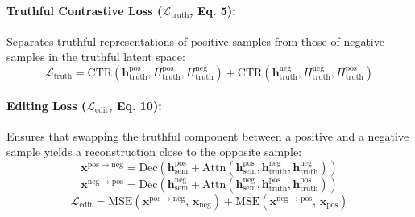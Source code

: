 \paragraph{Truthful Contrastive Loss ($\mathcal{L}_{\mathrm{truth}}$, Eq. 5):}
Separates truthful representations of positive samples from those of negative samples in the truthful latent space:
\begin{equation}
\label{eq:truthx_truth_loss}
\mathcal{L}_{\mathrm{truth}} = \mathrm{CTR}(\mathbf{h}_{\mathrm{truth}}^{\mathrm{pos}}, H_{\mathrm{truth}}^{\mathrm{pos}}, H_{\mathrm{truth}}^{\mathrm{neg}}) + \mathrm{CTR}(\mathbf{h}_{\mathrm{truth}}^{\mathrm{neg}}, H_{\mathrm{truth}}^{\mathrm{neg}}, H_{\mathrm{truth}}^{\mathrm{pos}})
\end{equation}

\paragraph{Editing Loss ($\mathcal{L}_{\mathrm{edit}}$, Eq. 10):}
Ensures that swapping the truthful component between a positive and a negative sample yields a reconstruction close to the opposite sample:
\begin{equation}
\label{eq:truthx_edit_pos_neg}
\mathbf{x}^{\mathrm{pos} \to \mathrm{neg}} = \mathrm{Dec}\!\left(\mathbf{h}_{\mathrm{sem}}^{\mathrm{pos}} + \mathrm{Attn}(\mathbf{h}_{\mathrm{sem}}^{\mathrm{pos}}, \mathbf{h}_{\mathrm{truth}}^{\mathrm{neg}}, \mathbf{h}_{\mathrm{truth}}^{\mathrm{neg}})\right)
\end{equation}
\begin{equation}
\label{eq:truthx_edit_neg_pos}
\mathbf{x}^{\mathrm{neg} \to \mathrm{pos}} = \mathrm{Dec}\!\left(\mathbf{h}_{\mathrm{sem}}^{\mathrm{neg}} + \mathrm{Attn}(\mathbf{h}_{\mathrm{sem}}^{\mathrm{neg}}, \mathbf{h}_{\mathrm{truth}}^{\mathrm{pos}}, \mathbf{h}_{\mathrm{truth}}^{\mathrm{pos}})\right)
\end{equation}
\begin{equation}
\label{eq:truthx_edit_loss}
\mathcal{L}_{\mathrm{edit}} = \mathrm{MSE}(\mathbf{x}^{\mathrm{pos} \to \mathrm{neg}},\, \mathbf{x}_{\mathrm{neg}}) + \mathrm{MSE}(\mathbf{x}^{\mathrm{neg} \to \mathrm{pos}},\, \mathbf{x}_{\mathrm{pos}})
\end{equation}

